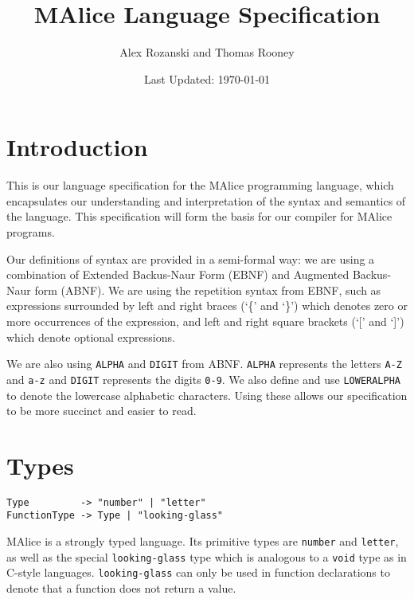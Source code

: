 \documentclass[a4wide, 11pt]{article}
\begin{document}
\title{MAlice Language Specification}

\author{Alex Rozanski and Thomas Rooney}

\date{Last Updated: \today}         %

\maketitle            %

\section{Introduction}

This is our language specification for the MAlice programming language, which encapsulates our understanding and interpretation of the syntax and semantics of the language. This specification will form the basis for our compiler for MAlice programs.

Our definitions of syntax are provided in a semi-formal way: we are using a combination of Extended Backus-Naur Form (EBNF) and Augmented Backus-Naur form (ABNF). We are using the repetition syntax from EBNF, such as expressions surrounded by left and right braces (`\{' and `\}') which denotes zero or more occurrences of the expression, and left and right square brackets (`[' and `]') which denote optional expressions.

We are also using \texttt{ALPHA} and \texttt{DIGIT} from ABNF. \texttt{ALPHA} represents the letters \texttt{A-Z} and \texttt{a-z} and \texttt{DIGIT} represents the digits \texttt{0-9}. We also define and use \texttt{LOWERALPHA} to denote the lowercase alphabetic characters. Using these allows our specification to be more succinct and easier to read.

\section{Types}

\begin{verbatim}
Type         -> "number" | "letter"
FunctionType -> Type | "looking-glass"
\end{verbatim}

MAlice is a strongly typed language. Its primitive types are \texttt{number} and \texttt{letter}, as well as the special \texttt{looking-glass} type which is analogous to a \texttt{void} type as in C-style languages. \texttt{looking-glass} can only be used in function declarations to denote that a function does not return a value.
\end{document}
